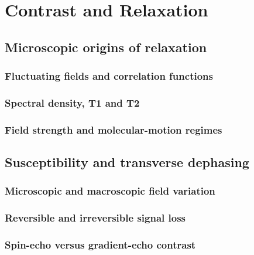 \chapter{Contrast and Relaxation}
\label{ch:09}

\section{Microscopic origins of relaxation}
\label{sec:09:microscopic-origins-of-relaxation}
\subsection{Fluctuating fields and correlation functions}
\subsection{Spectral density, T1 and T2}
\subsection{Field strength and molecular-motion regimes}

\section{Susceptibility and transverse dephasing}
\label{sec:09:susceptibility-and-transverse-dephasing}
\subsection{Microscopic and macroscopic field variation}
\subsection{Reversible and irreversible signal loss}
\subsection{Spin-echo versus gradient-echo contrast}

